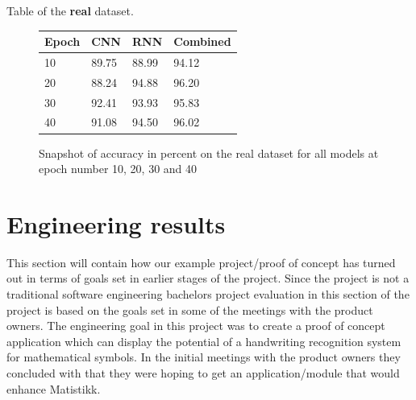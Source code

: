 Table of the \textbf{real} dataset.
\begin{figure}[H]
    \centering
    \begin{tabular}{| p{2cm} | p{3cm} | p{3cm} | p{3cm} |}
    \hline
    Epoch & \textbf{CNN} & \textbf{RNN} & \textbf{Combined} \\ \hline
    10 & 89.75 & 88.99 & 94.12 \\ \hline
    20 & 88.24 & 94.88 & 96.20 \\ \hline
    30 & 92.41 & 93.93 & 95.83 \\ \hline
    40 & 91.08 & 94.50 & 96.02 \\ \hline
    \end{tabular}
    \caption{Snapshot of accuracy in percent on the real dataset for all models at epoch number 10, 20, 30 and 40}
    \label{fig:table_real_dataset}

\end{figure}

\section{Engineering results}
This section will contain how our example project/proof of concept has turned out in terms of goals set in earlier stages of the project. Since the project is not a traditional software engineering bachelors project evaluation in this section of the project is based on the goals set in some of the meetings with the product owners. %
%
The engineering goal in this project was to create a proof of concept application which can display the potential of a handwriting recognition system for mathematical symbols. In the initial meetings with the product owners they concluded with that they were hoping to get an application/module that would enhance Matistikk. 
% 

